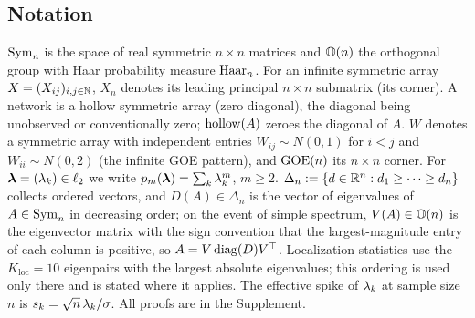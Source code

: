 \subsection{Notation}\label{sec:notation}

$\mathrm{Sym}_n$ is the space of real symmetric $n\times n$ matrices and
$\mathbb{O}(n)$ the orthogonal group with Haar probability measure $\mathrm{Haar}_n$.
For an infinite symmetric array $X=(X_{ij})_{i,j\in\mathbb{N}}$, $X_n$ denotes
its leading principal $n\times n$ submatrix (its corner). A network is
a hollow symmetric array (zero diagonal), the diagonal being unobserved
or conventionally zero; $\operatorname{hollow}(A)$ zeroes the diagonal of $A$. $W$
denotes a symmetric array with independent entries $W_{ij}\sim N(0,1)$
for $i<j$ and $W_{ii}\sim N(0,2)$ (the infinite GOE pattern), and
$\mathrm{GOE}(n)$ its $n\times n$ corner. For $\bm{\lambda}=(\lambda_k)\in\ell_2$ we
write $p_m(\bm{\lambda})=\sum_k\lambda_k^m$, $m\ge 2$. $\Delta_n:=\{d\in\mathbb{R}^n:d_1\ge\cdots\ge d_n\}$ collects ordered
vectors, and $D(A)\in\Delta_n$ is the
vector of eigenvalues of $A\in\mathrm{Sym}_n$ in decreasing order; on the event
of simple spectrum, $V(A)\in\mathbb{O}(n)$ is the eigenvector matrix with the
sign convention that the largest-magnitude entry of each column is
positive, so $A=V\operatorname{diag}(D)V^{\top}$. Localization statistics use the
$K_{\mathrm{loc}}=10$ eigenpairs with the largest absolute eigenvalues;
this ordering is used only there and is stated where it applies. The
effective spike of $\lambda_k$ at sample size $n$ is
$s_k=\sqrt{n}\,\lambda_k/\sigma$. All proofs are in the Supplement.
